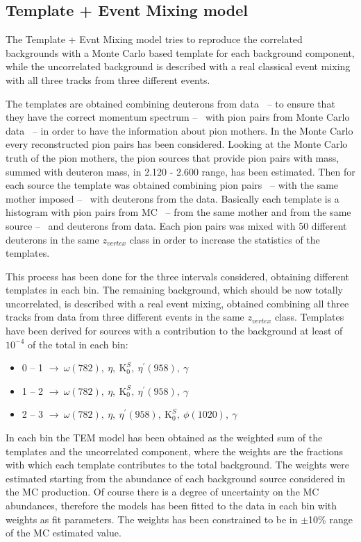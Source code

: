 %
\subsection{Template + Event Mixing model} \label{sec:tem}

The Template + Evnt Mixing model tries to reproduce the correlated backgrounds with a Monte Carlo
based template for each background component, while the uncorrelated background is described with a
real classical event mixing with all three tracks from three different events.

The templates are obtained combining deuterons from data \ -- to ensure that they have the correct
momentum spectrum -- \ with pion pairs from Monte Carlo data \ -- in order to have the information
about pion mothers.
In the Monte Carlo every reconstructed pion pairs has been considered.
Looking at the Monte Carlo truth of the pion mothers, the pion sources that provide pion pairs with 
mass, summed with deuteron mass, in 2.120 - 2.600 \gevcs range, has been estimated.
Then for each source the template was obtained combining pion pairs \ -- with the same mother imposed
-- \ with deuterons from the data. 
Basically each template is a \minv histogram with pion pairs from MC \ -- from the same mother and 
from the same source -- \ and deuterons from data. 
Each pion pairs was mixed with 50 different deuterons in the same $z_{vertex}$ class in order to 
increase the statistics of the templates.

This process has been done for the three \pt intervals considered, obtaining different templates in 
each \pt bin.
The remaining background, which should be now totally uncorrelated, is described with a real event 
mixing, obtained combining all three tracks from data from three different events in the same 
$z_{vertex}$ class.
Templates have been derived for sources with a contribution to the background at least of $10^{-4}$ of
the total in each \pt bin:
\begin{itemize}
  \item[] 0 -- 1 \gevc $\rightarrow \ \omega(782),\ \eta,\ \mathrm K_{0}^{S},\ \eta^{'}(958),\ \gamma $
  \item[] 1 -- 2 \gevc $\rightarrow \ \omega(782),\ \eta,\ \mathrm K_{0}^{S},\ \eta^{'}(958),\ \gamma $
  \item[] 2 -- 3 \gevc $\rightarrow \ \omega(782),\ \eta,\ \eta^{'}(958),\ \mathrm K_{0}^{S},\ \phi(1020),\ \gamma $
\end{itemize}

In each \pt bin the TEM model has been obtained as the weighted sum of the templates and the
uncorrelated component, where the weights are the fractions with which each template contributes to
the total background.
The weights were estimated starting from the abundance of each background source considered in the MC
production.
Of course there is a degree of uncertainty on the MC abundances, therefore the models has been fitted
to the data in each
\pt bin with weights as fit parameters. The weights has been constrained to be in $\pm$10\% range of 
the MC estimated value.

